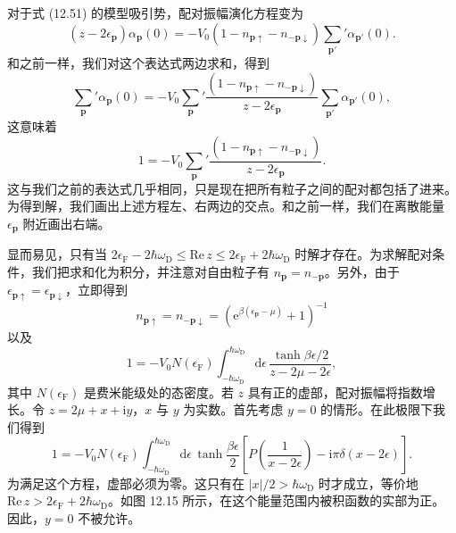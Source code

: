 对于式 (12.51) 的模型吸引势，配对振幅演化方程变为
\begin{equation*}
\left(z-2\epsilon_{\mathbf p}\right)\alpha_{\mathbf p}(0)=-V_0\left(1-n_{\mathbf p\uparrow}-n_{-\mathbf p\downarrow}\right){\sum_{\mathbf p'}}'\alpha_{\mathbf p'}(0). \tag{12.136}
\end{equation*}
和之前一样，我们对这个表达式两边求和，得到
\begin{equation*}
{\sum_{\mathbf p}}'\alpha_{\mathbf p}(0)=-V_0{\sum_{\mathbf p}}'\frac{\left(1-n_{\mathbf p\uparrow}-n_{-\mathbf p\downarrow}\right)}{z-2\epsilon_{\mathbf p}}{\sum_{\mathbf p'}}\alpha_{\mathbf p'}(0), \tag{12.137}
\end{equation*}
这意味着
\begin{equation*}
1=-V_0{\sum_{\mathbf p}}'\frac{\left(1-n_{\mathbf p\uparrow}-n_{-\mathbf p\downarrow}\right)}{z-2\epsilon_{\mathbf p}}. \tag{12.138}
\end{equation*}
这与我们之前的表达式几乎相同，只是现在把所有粒子之间的配对都包括了进来。为得到解，我们画出上述方程左、右两边的交点。和之前一样，我们在离散能量 $\epsilon_{\mathbf p}$ 附近画出右端。

显而易见，只有当 $2\epsilon_{\mathrm F}-2\hbar\omega_{\mathrm D}\leq\mathrm{Re}\,z\leq 2\epsilon_{\mathrm F}+2\hbar\omega_{\mathrm D}$ 时解才存在。为求解配对条件，我们把求和化为积分，并注意对自由粒子有 $n_{\mathbf p}=n_{-\mathbf p}$。另外，由于 $\epsilon_{\mathbf p\uparrow}=\epsilon_{\mathbf p\downarrow}$，立即得到
\begin{equation*}
n_{\mathbf p\uparrow}=n_{-\mathbf p\downarrow}=\left(\mathrm e^{\beta(\epsilon_{\mathbf p}-\mu)}+1\right)^{-1} \tag{12.139}
\end{equation*}
以及
\begin{equation*}
1=-V_0N\left(\epsilon_{\mathrm F}\right)\int_{-\hbar\omega_{\mathrm D}}^{\hbar\omega_{\mathrm D}}\mathrm d\epsilon\,\frac{\tanh\beta\epsilon/2}{z-2\mu-2\epsilon}, \tag{12.140}
\end{equation*}
其中 $N(\epsilon_{\mathrm F})$ 是费米能级处的态密度。若 $z$ 具有正的虚部，配对振幅将指数增长。令 $z=2\mu+x+\mathrm i y$，$x$ 与 $y$ 为实数。首先考虑 $y=0$ 的情形。在此极限下我们得到
\begin{equation*}
1=-V_0N\left(\epsilon_{\mathrm F}\right)\int_{-\hbar\omega_{\mathrm D}}^{\hbar\omega_{\mathrm D}}\mathrm d\epsilon\,\tanh\frac{\beta\epsilon}{2}\left[P\left(\frac{1}{x-2\epsilon}\right)-\mathrm i\pi\delta\left(x-2\epsilon\right)\right]. \tag{12.141}
\end{equation*}
为满足这个方程，虚部必须为零。这只有在 $|x|/2>\hbar\omega_{\mathrm D}$ 时才成立，等价地 $\mathrm{Re}\,z>2\epsilon_{\mathrm F}+2\hbar\omega_{\mathrm D}$。如图 12.15 所示，在这个能量范围内被积函数的实部为正。因此，$y=0$ 不被允许。


